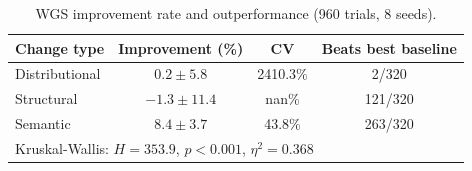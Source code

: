 \begin{table}[h]
\centering
\caption{WGS improvement rate and outperformance (960 trials, 8 seeds).}
\label{tab:wgs_improvement}
\small
\begin{tabular}{@{}lccc@{}}
\toprule
Change type & Improvement (\%) & CV & Beats best baseline \\
\midrule
Distributional & $0.2\pm5.8$ & 2410.3\% & 2/320 \\
Structural & $-1.3\pm11.4$ & nan\% & 121/320 \\
Semantic & $8.4\pm3.7$ & 43.8\% & 263/320 \\
\midrule
\multicolumn{4}{l}{\footnotesize Kruskal-Wallis: $H=353.9$, $p<0.001$, $\eta^2=0.368$} \\
\bottomrule
\end{tabular}
\end{table}